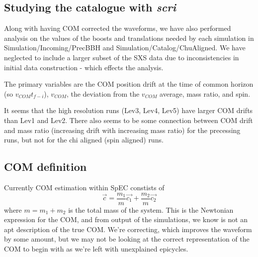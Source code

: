 \documentclass{article}
\begin{document}
\subsection{Studying the catalogue with \textit{scri}}
Along with having COM corrected the waveforms, we have also performed analysis on the values of the boosts and translations needed by each simulation in Simulation/Incoming/PrecBBH and Simulation/Catalog/ChuAligned. We have neglected to include a larger subset of the SXS data due to inconsistencies in initial data construction - which effects the analysis.

The primary variables are the COM position drift at the time of common horizon (so $v_{COM}t_{f-i}$), $v_{COM}$, the deviation from the $v_{COM}$ average, mass ratio, and spin.

It seems that the high resolution runs (Lev3, Lev4, Lev5) have larger COM drifts than Lev1 and Lev2. There also seems to be some connection between COM drift and mass ratio (increasing drift with increasing mass ratio) for the precessing runs, but not for the chi aligned (spin aligned) runs.



\subsection{COM definition}
Currently COM estimation within SpEC constists of 
\begin{equation}
\vec{c} = \frac{m_{1}}{m} \vec{c_1} + \frac{m_{2}}{m} \vec{c_2}
\end{equation}
where $m = m_1 + m_2$ is the total mass of the system. This is the Newtonian expression for the COM, and from output of the simulations, we know is not an apt description of the true COM. We're correcting, which improves the waveform by some amount, but we may not be looking at the correct representation of the COM to begin with as we're left with unexplained epicycles. 
\end{document}
